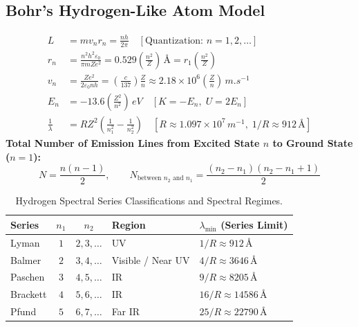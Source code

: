\documentclass[10pt,twoside,openright]{book}
\begin{document}
\subsection{Bohr's Hydrogen-Like Atom Model}

\begin{formulabox}
\begin{align}
  L &= m v_n r_n = \frac{n h}{2\pi} \quad [\text{Quantization: } n = 1, 2, \dots] \\
  r_n &= \frac{n^2 h^2 \varepsilon_0}{\pi m Z e^2} = 0.529\left(\frac{n^2}{Z}\right)\,\text{\AA} = r_1\left(\frac{n^2}{Z}\right) \\
  v_n &= \frac{Z e^2}{2\varepsilon_0 n h} = \left(\frac{c}{137}\right)\frac{Z}{n} \approx 2.18\times 10^6\left(\frac{Z}{n}\right)\,\si{m.s^{-1}} \\
  E_n &= -13.6\left(\frac{Z^2}{n^2}\right)\,\si{eV} \quad [K = -E_n,\; U = 2E_n] \\
  \frac{1}{\lambda} &= R Z^2\left(\frac{1}{n_1^2} - \frac{1}{n_2^2}\right) \quad [R \approx 1.097\times 10^7\,\si{m^{-1}},\; 1/R \approx 912\,\text{\AA}]
\end{align}
\textbf{Total Number of Emission Lines from Excited State $n$ to Ground State ($n=1$):}
\begin{equation}
  N = \frac{n(n - 1)}{2}, \qquad N_{\text{between } n_2 \text{ and } n_1} = \frac{(n_2 - n_1)(n_2 - n_1 + 1)}{2}
\end{equation}
\end{formulabox}

\begin{table}[htbp]
\centering
\footnotesize
\setlength{\tabcolsep}{3pt}
\renewcommand{\arraystretch}{1.2}
\begin{tabularx}{\textwidth}{>{\hsize}L c c >{\hsize}Y >{\hsize}Y}
\toprule
\textbf{Series} & \textbf{$n_1$} & \textbf{$n_2$} & \textbf{Region} & \textbf{$\lambda_{\min}$ (Series Limit)} \\
\midrule
Lyman & $1$ & $2, 3, \dots$ & UV & $1/R \approx 912\,\text{\AA}$ \\
Balmer & $2$ & $3, 4, \dots$ & Visible / Near UV & $4/R \approx 3646\,\text{\AA}$ \\
Paschen & $3$ & $4, 5, \dots$ & IR & $9/R \approx 8205\,\text{\AA}$ \\
Brackett & $4$ & $5, 6, \dots$ & IR & $16/R \approx 14586\,\text{\AA}$ \\
Pfund & $5$ & $6, 7, \dots$ & Far IR & $25/R \approx 22790\,\text{\AA}$ \\
\bottomrule
\end{tabularx}
\caption{Hydrogen Spectral Series Classifications and Spectral Regimes.}
\end{table}
\end{document}
